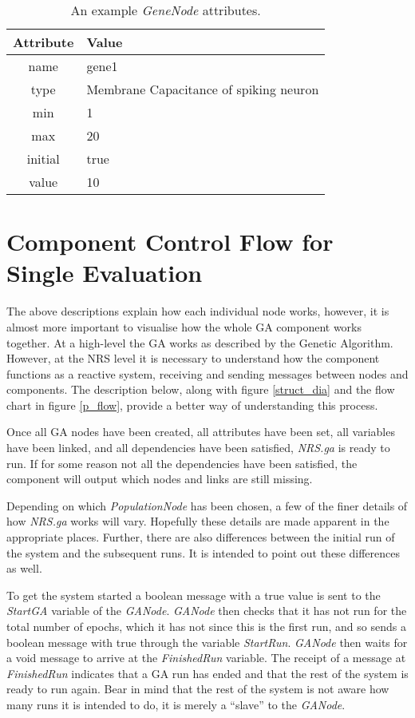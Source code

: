 \documentclass[10pt, notitlepage, a4paper]{article}
\begin{document}
\begin{table}[!ht]
\begin{center}
\caption{An example {\it GeneNode} attributes.}
\label{attrbs}
\begin{tabular}{|c|l|}
\hline Attribute & Value\\ \hline
\hline name & gene1\\
\hline type & Membrane Capacitance of spiking neuron\\
\hline min & 1\\
\hline max & 20\\
\hline initial & true\\
\hline value & 10\\\hline
\end{tabular}
\end{center}
\end{table}

\section{Component Control Flow for Single Evaluation}
The above descriptions explain how each individual node works, however, it is almost more important to visualise how the whole GA component works together. At a high-level the GA works as described by the Genetic Algorithm. However, at the NRS level it is necessary to understand how the component functions as a reactive system, receiving and sending messages between nodes and components. The description below, along with figure \ref{struct_dia} and the flow chart in figure \ref{p_flow}, provide a better way of understanding this process.

Once all GA nodes have been created, all attributes have been set, all variables have been linked, and all dependencies have been satisfied, {\it NRS.ga} is ready to run. If for some reason not all the dependencies have been satisfied, the component will output which nodes and links are still missing.

Depending on which {\it PopulationNode} has been chosen, a few of the finer details of how {\it NRS.ga} works will vary. Hopefully these details are made apparent in the appropriate places. Further, there are also differences between the initial run of the system and the subsequent runs. It is intended to point out these differences as well.

To get the system started a boolean message with a true value is sent to the {\it StartGA} variable of the {\it GANode}. {\it GANode} then checks that it has not run for the total number of epochs, which it has not since this is the first run, and so sends a boolean message with true through the variable {\it StartRun}. {\it GANode} then waits for a void message to arrive at the {\it FinishedRun} variable. The receipt of a message at {\it FinishedRun} indicates that a GA run has ended and that the rest of the system is ready to run again. Bear in mind that the rest of the system is not aware how many runs it is intended to do, it is merely a ``slave'' to the {\it GANode}.
\end{document}
